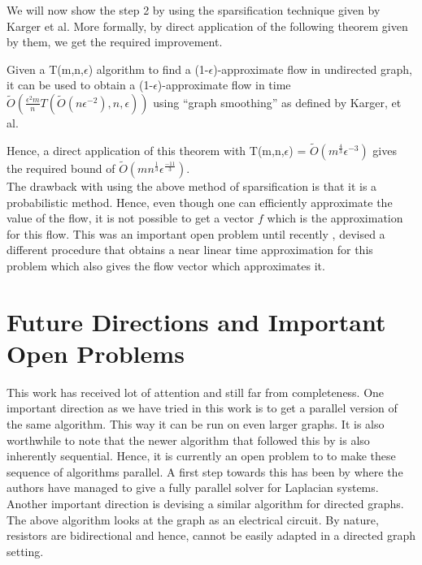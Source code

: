 \documentclass[BTech]{iitmdiss}
\begin{document}
		We will now show the step 2 by using the sparsification technique given by Karger et al. More formally, by direct application of the 
		following theorem given by them, we get the required improvement. 
		
		\begin{thm}
		 Given a T(m,n,$\epsilon$) algorithm to find a (1-$\epsilon$)-approximate flow in undirected graph, it can be used to obtain 
		 a (1-$\epsilon$)-approximate flow in time $\widetilde{O}(\frac{\epsilon^2 m}{n}T(\widetilde{O}(n \epsilon^{-2}),n,\epsilon))$ using 
		 ``graph smoothing'' as defined by Karger, et al.
		\end{thm}

		Hence, a direct application of this theorem with T(m,n,$\epsilon$) = $\widetilde{O}(m^{\frac{4}{3}} \epsilon^{-3})$ gives 
		the required bound of $\widetilde{O}(mn^{\frac{1}{3}} \epsilon^{\frac{-11}{3}})$. \\
		
		The drawback with using the above method of sparsification is that it is a probabilistic method. Hence, even though one can efficiently
		approximate the value of the flow, it is not possible to get a vector $f$ which is the approximation for this flow. This was an important
		open problem until recently \cite{DBLP:journals/corr/abs-1304-2338}, devised a different procedure that obtains a near linear time approximation for this
		problem which also gives the flow vector which approximates it. 
		
		\section{Future Directions and Important Open Problems}
		 This work has received lot of attention and still far from completeness. One important direction as we have tried in this work is to
		 get a parallel version of the same algorithm. This way it can be run on even larger graphs. It is also worthwhile to note that 
		 the newer algorithm that followed this by \cite{DBLP:journals/corr/abs-1304-2338} is also inherently sequential. Hence, it is currently an open problem to
		 to make these sequence of algorithms parallel. A first step towards this has been by \cite{DBLP:journals/corr/PengS13} where the authors have managed
		 to give a fully parallel solver for Laplacian systems. \\
		 
		 Another important direction is devising a similar algorithm for directed graphs. The above algorithm looks at the graph as an electrical
		 circuit. By nature, resistors are bidirectional and hence, cannot be easily adapted in a directed graph setting. \\
		 
\end{document}
